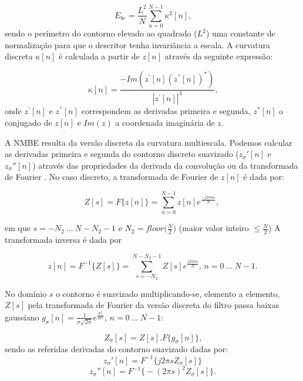 \begin{equation}
E_{be} = \frac{L^{2}}{N}\sum_{n=0}^{N-1}\kappa^{2}[n]\text{,}
\label{eq:ebe}
\end{equation}
\noindent
sendo o perímetro do contorno elevado ao quadrado ($L^2$) uma constante de normalização para que o descritor tenha invariância a escala. A curvatura discreta $\kappa[n]$ é calculada a partir de $z[n]$ através da seguinte expressão:

\begin{equation}
\kappa[n] = \frac{-Im(z^{'}[n](z^{''}[n])^{*})}{|z^{'}[n]|^3} \text{,}
\label{eq:kn}
\end{equation}
\noindent
onde $z^{'}[n]$ e $z^{''}[n]$ correspondem as derivadas primeira e segunda, $z^{*}[n]$ o conjugado de $z[n]$ e $Im(z)$ a coordenada imaginária de $z$. 

A \ac{NMBE} resulta da versão discreta da curvatura multiescala. Podemos calcular as derivadas primeira e segunda do contorno discreto suavizado ($z_\sigma'[n]$ e $z_\sigma''[n]$) através das propriedades da derivada da convolução ou da transformada de Fourier \cite{Costa:1997}. No caso discreto, a transformada de Fourier de $z[n]$ é dada por:  

\begin{equation}
Z[s] = F\big\{z[n]\big\} = \sum\limits_{n=0}^{N-1}z[n]e^{\frac{-j2\pi ns}{N}} \text{, }
\end{equation}

\noindent em que $s = -N_{2}\: \ldots \: N-N_{2}-1$ e $N_{2}= floor\big(\frac{N}{2}\big)$ (maior valor inteiro $\le \frac{N}{2}$) A transformada inversa é dada por  

\begin{equation}
z[n] = F^{-1}\big\{Z[s]\big\} = \sum\limits_{s = -N_{2}}^{N-N_{2}-1}Z[s]e^{\frac{j2\pi n s}{N}}\text{, }n = 0\: \ldots \: N-1\text{.}
\end{equation}

No domínio $s$ o contorno é suavizado multiplicando-se, elemento a elemento, $Z[s]$ pela transformada de Fourier da versão discreta do filtro passa baixas gaussiano $g_\sigma[n] = \frac{1}{\sigma\sqrt{2\pi}}e^{\frac{n^2}{2\sigma^2}}\text{, } 
n = 0 \: \ldots \: N-1$:

\begin{equation}
Z_\sigma[s] = Z[s].F\big\{g_\sigma[n]\big\}\text{,}
\end{equation}
\noindent
sendo as referidas derivadas do contorno suavizado dadas por:
\begin{equation}
z_\sigma'[n] = F^{-1}\big\{j2\pi s Z_\sigma[s]\big\}
\end{equation}
\begin{equation}
z_\sigma''[n] = F^{-1}\big\{-(2\pi s)^2 Z_\sigma[s]\big\}\text{.}
\end{equation}

